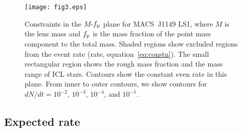 \documentclass[showpacs,twocolumn,preprintnumbers,amsmath,amssymb,superscriptaddress,nofootinbib]{revtex4}
\begin{document}
\begin{figure}[t]
\begin{center}
\texttt{[image: fig3.eps]}
\end{center}
\caption{Constraints in the $M$-$f_{\rm p}$ plane for MACS~J1149 LS1,
  where $M$ is the lens mass and $f_{\rm p}$ is the mass fraction of
  the point mass component to the total mass. Shaded regions show
  excluded regions from the event rate (rate,
  equation~\ref{eq:constn}). The small rectangular region 
  shows the rough mass fraction and the mass range of ICL stars.
  Contours show the constant even rate in this plane. From inner to
  outer contours, we show contours for $dN/dt=10^{-2}$,
  $10^{-3}$, $10^{-4}$, and $10^{-5}$.}
\label{fig:rate}
\end{figure}

\subsection{Expected rate}
\label{sec:erate}
\end{document}
